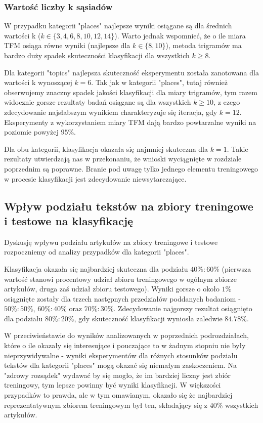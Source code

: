 \documentclass{classrep}
\begin{document}
\subsubsection{Wartość liczby k sąsiadów}
W przypadku kategorii "places" najlepsze wyniki osiągane są dla średnich wartości k ($k \in \{3, 4, 6, 8, 10, 12, 14\}$). Warto jednak wspomnieć, że o ile miara TFM osiąga równe wyniki (najlepsze dla $k \in \{8, 10\}$), metoda trigramów ma bardzo duży spadek skuteczności klasyfikacji dla wszystkich $k\geq8$. \newline

Dla kategorii "topics" najlepsza skuteczność eksperymentu została zanotowana dla wartości k wynoszącej $k=6$. Tak jak w kategorii "places", tutaj również obserwujemy znaczny spadek jakości klasyfikacji dla miary trigramów, tym razem widocznie gorsze rezultaty badań osiągane są dla wszystkich $k\geq10$, z czego zdecydowanie najsłabszym wynikiem charakteryzuje się iteracja, gdy $k=12$. Eksperymenty z wykorzystaniem miary TFM dają bardzo powtarzalne wyniki na poziomie powyżej $95\%$. \newline

Dla obu kategorii, klasyfikacja okazała się najmniej skuteczna dla $k=1$. Takie rezultaty utwierdzają nas w przekonaniu, że wnioski wyciągnięte w rozdziale poprzednim są poprawne. Branie pod uwagę tylko jednego elementu treningowego w procesie klasyfikacji jest zdecydowanie niewsytarczające.

\subsection{Wpływ podziału tekstów na zbiory treningowe i testowe na klasyfikację}
Dyskusję wpływu podziału artykułów na zbiory treningowe i testowe rozpoczniemy od analizy przypadków dla kategorii "places".  \newline

Klasyfikacja okazała się najbardziej skuteczna dla podziału $40\%:60\%$ (pierwsza wartość stanowi procentowy udział zbioru treningowego w ogólnym zbiorze artykułów, druga zaś udział zbioru testowego). Wyniki gorsze o około $1\%$ osiągnięte zostały dla trzech następnych przedziałów poddanych badaniom - $50\%:50\%$, $60\%:40\%$ oraz $70\%:30\%$. Zdecydowanie najgorszy rezultat osiągnięto dla podziału $80\%:20\%$, gdy skuteczność klasyfikacji wyniosła zaledwie $84.78\%$.\newline

W przeciwieństawie do wyników analizowanych w poprzednich podrozdziałach, które o ile okazały się interesujące i pouczające to w żadnym stopniu nie były nieprzywidywalne - wyniki eksperymentów dla różnych stosunków podziału tekstów dla kategorii "places" mogą okazać się niemałym zaskoczeniem. Na "zdrowy rozsądek" wydawać by się mogło, że im bardziej liczny jest zbiór treningowy, tym lepsze powinny być wyniki klasyfikacji. W większości przypadków to prawda, ale w tym omawianym, okazało się że najbardziej reprezentatywnym zbiorem treningowym był ten, składający się z $40\%$ wszystkich artykułów.\newline
\end{document}
